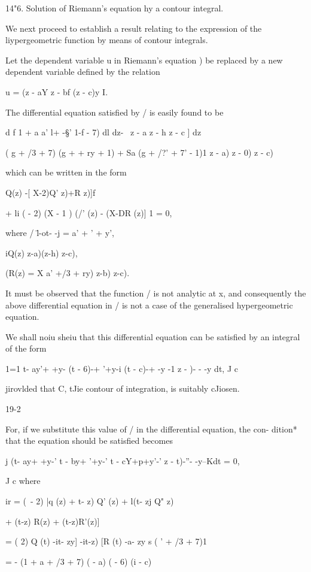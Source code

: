 14"6. Solution of Riemann's equation hy a contour integral.

We next proceed to establish a result relating to the expression of
the liypergeometric function by means of contour integrals.

Let the dependent variable u in Riemann's equation ) be
replaced by a new dependent variable defined by the relation

u = (z - aY z - bf (z - c)y I.

The differential equation satisfied by / is easily found to be

d f 1 + a a' l+ -§' 1-f - 7) dl dz- \ z - a z - h z - c ] dz

( g + /3 + 7) (g + + ry + 1) + Sa (g + /?' + 7' - 1)1 z - a) z - 0) z
- c)

which can be written in the form

Q(z) -[ X-2)Q' z)+R z)]f

+ li ( - 2) (X - 1 ) (/' (z) - (X-DR (z)] 1 = 0,

where / \=l-ot- -j = a' + ' + y',

iQ(z) z-a)(z-h) z-c),

(R(z) = X a' +/3 + ry) z-b) z-c).

It must be observed that the function / is not analytic at x, and
consequently the above differential equation in / is not a case of the
generalised hypergeometric equation.

We shall noiu sheiu that this differential equation can be satisfied
by an integral of the form

1=1 t- ay'+ +y- (t - 6)-+ '+y-i (t - c)-+ -y -1 z - )- - -y dt, J c

jirovlded that C, tJie contour of integration, is suitably cJiosen.

19-2

%
%

For, if we substitute this value of / in the differential equation,
the con- dition* that the equation should be satisfied becomes

j (t- ay+ +y-' t - by+ '+y-' t - cY+p+y'-' z - t)-''- -y--Kdt = 0,

J c where

ir = (\ - 2) |q (z) + t- z) Q' (z) + l(t- zj Q" z)

+ (t-z) R(z) + (t-z)R'(z)]

= ( 2) Q (t) -it- zy] -it-z) [R (t) -a- zy s ( ' + /3 + 7)1

= - (1 + a + /3 + 7) ( - a) ( - 6) (i - c)

